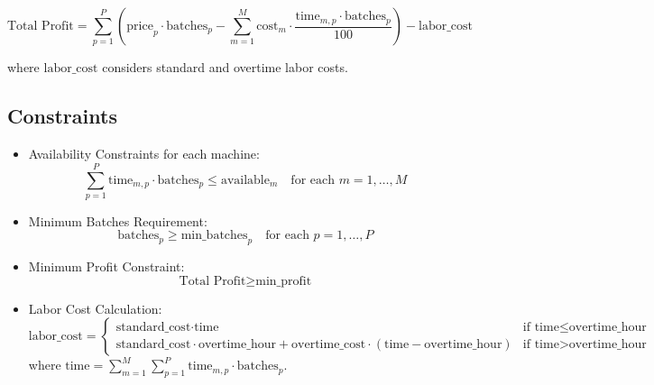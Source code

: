 \documentclass{article}
\begin{document}
\[
\text{Total Profit} = \sum_{p=1}^{P} \left( \text{price}_{p} \cdot \text{batches}_{p} - \sum_{m=1}^{M} \text{cost}_{m} \cdot \frac{\text{time}_{m,p} \cdot \text{batches}_{p}}{100} \right) - \text{labor\_cost}
\]

where \( \text{labor\_cost} \) considers standard and overtime labor costs.

\subsection*{Constraints}
\begin{itemize}
    \item Availability Constraints for each machine:
    \[
    \sum_{p=1}^{P} \text{time}_{m,p} \cdot \text{batches}_{p} \leq \text{available}_{m} \quad \text{for each } m = 1, \ldots, M
    \]

    \item Minimum Batches Requirement:
    \[
    \text{batches}_{p} \geq \text{min\_batches}_{p} \quad \text{for each } p = 1, \ldots, P
    \]

    \item Minimum Profit Constraint:
    \[
    \text{Total Profit} \geq \text{min\_profit}
    \]

    \item Labor Cost Calculation:
    \[
    \text{labor\_cost} = \begin{cases} 
    \text{standard\_cost} \cdot \text{time} & \text{if } \text{time} \leq \text{overtime\_hour} \\
    \text{standard\_cost} \cdot \text{overtime\_hour} + \text{overtime\_cost} \cdot (\text{time} - \text{overtime\_hour}) & \text{if } \text{time} > \text{overtime\_hour}
    \end{cases}
    \]
    where \( \text{time} = \sum_{m=1}^{M} \sum_{p=1}^{P} \text{time}_{m,p} \cdot \text{batches}_{p} \).
\end{itemize}
\end{document}
